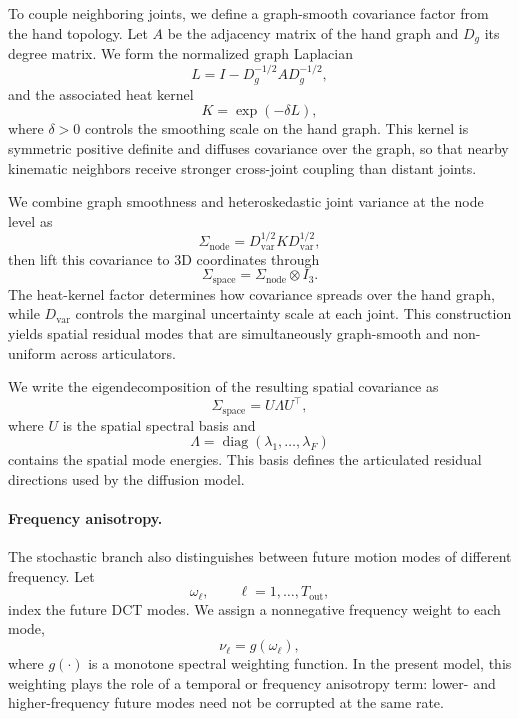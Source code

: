 To couple neighboring joints, we define a graph-smooth covariance factor from the hand topology. Let \(A\) be the adjacency matrix of the hand graph and \(D_g\) its degree matrix. We form the normalized graph Laplacian \cite{chung1997spectral}
\[
L = I - D_g^{-1/2} A D_g^{-1/2},
\]
and the associated heat kernel
\[
K = \exp(-\delta L),
\]
where \(\delta>0\) controls the smoothing scale on the hand graph. This kernel is symmetric positive definite and diffuses covariance over the graph, so that nearby kinematic neighbors receive stronger cross-joint coupling than distant joints.

We combine graph smoothness and heteroskedastic joint variance at the node level as
\[
\Sigma_{\mathrm{node}}
=
D_{\mathrm{var}}^{1/2} K D_{\mathrm{var}}^{1/2},
\]
then lift this covariance to 3D coordinates through
\[
\Sigma_{\mathrm{space}} = \Sigma_{\mathrm{node}} \otimes I_3.
\]
The heat-kernel factor determines how covariance spreads over the hand graph, while \(D_{\mathrm{var}}\) controls the marginal uncertainty scale at each joint. This construction yields spatial residual modes that are simultaneously graph-smooth and non-uniform across articulators.

We write the eigendecomposition of the resulting spatial covariance as
\[
\Sigma_{\mathrm{space}} = U \Lambda U^\top,
\]
where $U$ is the spatial spectral basis and
\[
\Lambda = \operatorname{diag}(\lambda_1,\dots,\lambda_{F})
\]
contains the spatial mode energies. This basis defines the articulated residual directions used by the diffusion model.

\paragraph{Frequency anisotropy.}
The stochastic branch also distinguishes between future motion modes of different frequency. Let
\[
\omega_\ell, \qquad \ell=1,\dots,T_{\mathrm{out}},
\]
index the future DCT modes. We assign a nonnegative frequency weight to each mode,
\[
\nu_\ell = g(\omega_\ell),
\]
where $g(\cdot)$ is a monotone spectral weighting function. In the present model, this weighting plays the role of a temporal or frequency anisotropy term: lower- and higher-frequency future modes need not be corrupted at the same rate.

